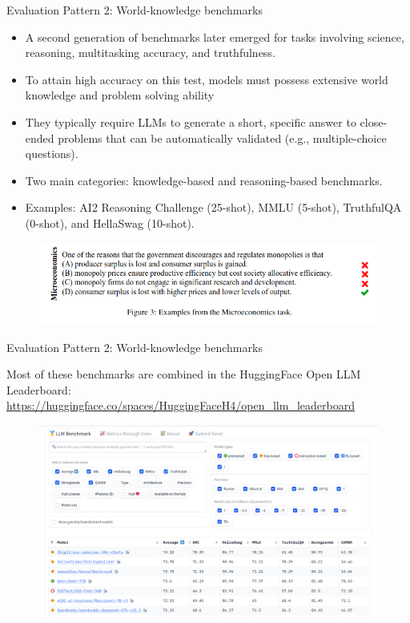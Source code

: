 \documentclass[handout]{beamer}
\begin{document}
\begin{frame}{Evaluation Pattern 2: World-knowledge benchmarks}
\begin{scriptsize}
\begin{itemize}
\item A second generation of benchmarks later emerged for tasks involving science, reasoning, multitasking accuracy, and truthfulness.
\item To attain high accuracy on this test, models must possess extensive world knowledge and problem solving ability
\item They typically require LLMs to generate a short, specific answer to close-ended problems that can be automatically validated (e.g., multiple-choice questions).
\item Two main categories: knowledge-based and reasoning-based benchmarks.
\item  Examples: AI2 Reasoning Challenge (25-shot), MMLU (5-shot), TruthfulQA (0-shot), and HellaSwag (10-shot).

\end{itemize}
\end{scriptsize}
      \begin{figure}[h]
	\includegraphics[scale = 0.4]{pics/MMLU.png}
\end{figure}

\end{frame}




\begin{frame}{Evaluation Pattern 2: World-knowledge benchmarks}
\begin{scriptsize}
Most of these benchmarks are combined in the HuggingFace Open LLM Leaderboard: \url{https://huggingface.co/spaces/HuggingFaceH4/open_llm_leaderboard}
\end{scriptsize}
      \begin{figure}[h]
	\includegraphics[scale = 0.18]{pics/openLLMbenchmark.png}
\end{figure}

\end{frame}
\end{document}
